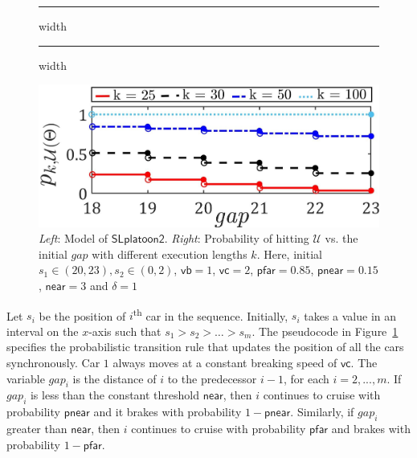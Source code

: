 \documentclass[11pt]{article}
\theoremstyle{definition}
\newcommand{\Unsafe}{\mathcal{U}}
\newcommand{\SlplatoonTwo}{{$\mathsf{SLplatoon2}$\xspace}}
\newcommand{\two}[4]{
  \parbox{.95\columnwidth}{\vspace{1pt} \vfill
    \parbox[t]{#1\columnwidth}{#3}%
    \parbox[t]{#2\columnwidth}{#4}%
  }}
\begin{document}
%
\begin{figure}
	\begin{minipage}{0.5\textwidth}
		\hrule width\textwidth
{}
		\hrule width\textwidth
	\end{minipage}
	\begin{minipage}{0.5\textwidth}
\includegraphics[width=\textwidth]{probs_time_horizon_Example2_New.jpg}
	\end{minipage}
	\caption{\textit{Left}: Model of  \SlplatoonTwo. \textit{Right}: Probability of hitting $\Unsafe$ vs. the initial $\mathit{gap}$ with different execution lengths $k$. Here, initial $s_1 \in  (20,23), s_2 \in  (0,2)$, $\mathsf{vb} = 1$, $\mathsf{vc} = 2$, $\mathsf{pfar} = 0.85$, $\mathsf{pnear} = 0.15$, $\mathsf{near} = 3$ and $\delta = 1$ }
	\label{fig:singlelane}
\end{figure}
%
 Let $s_{i}$ be the position of $i$\textsuperscript{th} car in the sequence. Initially, $s_i$ takes a value in an interval on the $x$-axis such that $s_{1} > s_{2} >\ldots > s_{m}$.
The pseudocode in Figure~\ref{fig:singlelane} specifies the probabilistic transition rule that updates the position of all the cars synchronously. Car $1$ always moves at a constant breaking speed of $\mathsf{vc}$.
%
The variable $\mathit{gap}_i$ is the distance of $i$ to the predecessor $i-1$, for each $i=2,...,m$.
If $\mathit{gap}_i$ is less than the constant threshold $\mathsf{near}$, then $i$ continues to cruise with probability $\mathsf{pnear}$ and it brakes with probability $1- \mathsf{pnear}.$
Similarly, if $\mathit{gap}_i$ greater than $\mathsf{near}$, then $i$ continues to cruise with probability $\mathsf{pfar}$ and brakes with probability $1- \mathsf{pfar}.$
\end{document}
